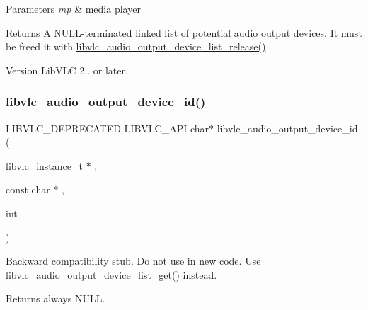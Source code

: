 \begin{DoxyParams}{Parameters}
{\em mp} & media player \\
\hline
\end{DoxyParams}
\begin{DoxyReturn}{Returns}
A N\+U\+L\+L-\/terminated linked list of potential audio output devices. It must be freed it with \hyperlink{group__libvlc__audio_gae96430562ae07bfba7d0e841391be8b3}{libvlc\+\_\+audio\+\_\+output\+\_\+device\+\_\+list\+\_\+release()} 
\end{DoxyReturn}
\begin{DoxyVersion}{Version}
Lib\+V\+LC 2.. or later. 
\end{DoxyVersion}
\mbox{\label{group__libvlc__audio_gaa54dc93a0adeb65752d3a72848db630c}} 
\subsubsection{\texorpdfstring{libvlc\+\_\+audio\+\_\+output\+\_\+device\+\_\+id()}{libvlc\_audio\_output\_device\_id()}}
{\footnotesize\ttfamily L\+I\+B\+V\+L\+C\+\_\+\+D\+E\+P\+R\+E\+C\+A\+T\+ED L\+I\+B\+V\+L\+C\+\_\+\+A\+PI char$\ast$ libvlc\+\_\+audio\+\_\+output\+\_\+device\+\_\+id (\begin{DoxyParamCaption}\item[{\hyperlink{group__libvlc__core_ga316d739a80da4678206c79f4d6c2e284}{libvlc\+\_\+instance\+\_\+t} $\ast$}]{,  }\item[{const char $\ast$}]{,  }\item[{int}]{ }\end{DoxyParamCaption})}

Backward compatibility stub. Do not use in new code. Use \hyperlink{group__libvlc__audio_ga4f94073a71cd9ee6641ce9bbbfdaf5f3}{libvlc\+\_\+audio\+\_\+output\+\_\+device\+\_\+list\+\_\+get()} instead. \begin{DoxyReturn}{Returns}
always N\+U\+LL. 
\end{DoxyReturn}
\mbox{\label{group__libvlc__audio_ga4f94073a71cd9ee6641ce9bbbfdaf5f3}} 
